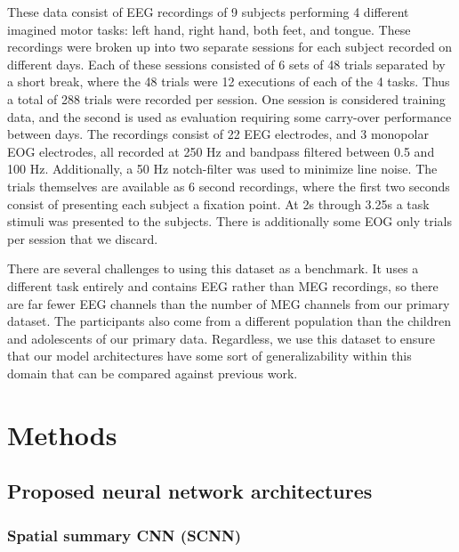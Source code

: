 \documentclass[utf8]{frontiersSCNS} %
\begin{document}
These data consist of EEG recordings of 9 subjects performing 4 different imagined motor tasks: left hand, right hand, both feet, and tongue. These recordings were broken up into two separate sessions for each subject recorded on different days. Each of these sessions consisted of 6 sets of 48 trials separated by a short break, where the 48 trials were 12 executions of each of the 4 tasks. Thus a total of 288 trials were recorded per session. One session is considered training data, and the second is used as evaluation requiring some carry-over performance between days. The recordings consist of 22 EEG electrodes, and 3 monopolar EOG electrodes, all recorded at 250 Hz and bandpass filtered between 0.5 and 100 Hz. Additionally, a 50 Hz notch-filter was used to minimize line noise. The trials themselves are available as 6 second recordings, where the first two seconds consist of presenting each subject a fixation point. At 2s through 3.25s a task stimuli was presented to the subjects. There is additionally some EOG only trials per session that we discard. 

There are several challenges to using this dataset as a benchmark. It uses a different task entirely and contains EEG rather than MEG recordings, so there are far fewer EEG channels than the number of MEG channels from our primary dataset. The participants also come from a different population than the children and adolescents of our primary data. Regardless, we use this dataset to ensure that our model architectures have some sort of generalizability within this domain that can be compared against previous work. 

\section{Methods}

\subsection{Proposed neural network architectures}

\subsubsection{Spatial summary CNN (SCNN)} \label{sec:scnn}
\end{document}
